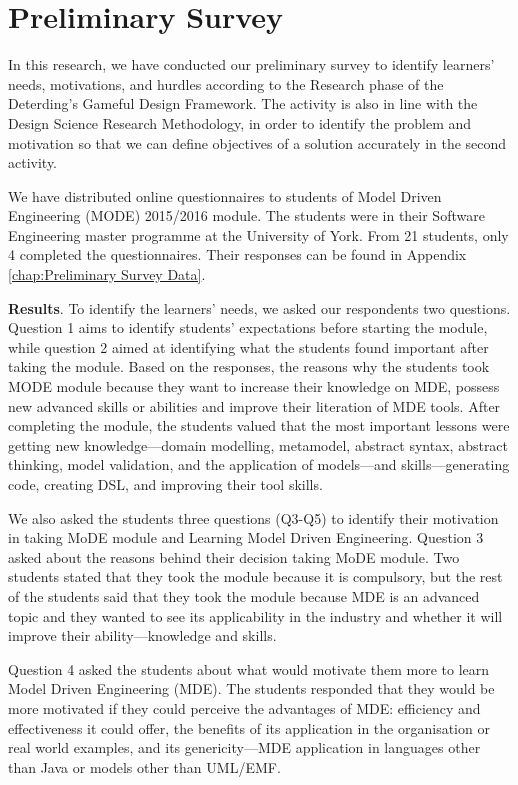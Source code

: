 \documentclass[12pt, a4paper]{report}
\begin{document}
{\section{Preliminary Survey}
\label{Preliminary Survey}
In this research, we have conducted our preliminary survey to identify learners' needs, motivations, and hurdles according to the Research phase of the Deterding's Gameful Design Framework. The activity is also in line with the Design Science Research Methodology, in order to identify the problem and motivation so that we can define objectives of a solution accurately in the second activity. 

We have distributed online questionnaires to students of Model Driven Engineering (MODE) 2015/2016 module. The students were in their Software Engineering master programme at the University of York. From 21 students, only 4 completed the questionnaires. Their responses can be found in Appendix \autoref{chap:Preliminary Survey Data}.

\textbf{Results}. To identify the learners' needs, we asked our respondents two questions. Question 1 aims to identify students' expectations before starting the module, while question 2 aimed at identifying what the students found important after taking the module. Based on the responses, the reasons why the students took MODE module because they want to increase their knowledge on MDE, possess new advanced skills or abilities and improve their literation of MDE tools. After completing the module, the students valued that the most important lessons were getting new knowledge---domain modelling, metamodel, abstract syntax, abstract thinking, model validation, and the application of models---and skills---generating code, creating DSL, and improving their tool skills. 

We also asked the students three questions (Q3-Q5) to identify their motivation in taking MoDE module and Learning Model Driven Engineering. Question 3 asked about the reasons behind their decision taking MoDE module. Two students stated that they took the module because it is compulsory, but the rest of the students said that they took the module because MDE is an advanced topic and they wanted to see its applicability in the industry and whether it will improve their ability---knowledge and skills. 

Question 4 asked the students about what would motivate them more to learn Model Driven Engineering (MDE). The students responded that they would be more motivated if they could perceive the advantages of MDE: efficiency and effectiveness it could offer, the benefits of its application in the organisation or real world examples, and its genericity---MDE application in languages other than Java or models other than UML/EMF.

}
\end{document}
